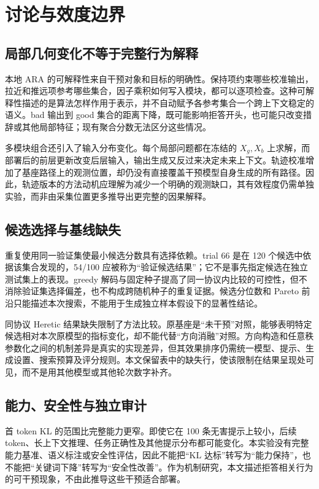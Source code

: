 \section{讨论与效度边界}
\label{sec:discussion}

\subsection{局部几何变化不等于完整行为解释}

本地 ARA 的可解释性来自干预对象和目标的明确性。保持项约束哪些校准输出，拉近和推远项参考哪些集合，因子乘积如何写入模块，都可以逐项检查。这种可解释性描述的是算法怎样作用于表示，并不自动赋予各参考集合一个跨上下文稳定的语义。bad 输出到 good 集合的距离下降，既可能影响拒答开头，也可能只改变措辞或其他局部特征；现有聚合分数无法区分这些情况。

多模块组合还引入了输入分布变化。每个局部问题都在冻结的 $X_g,X_b$ 上求解，而部署后的前层更新改变后层输入，输出生成又反过来决定未来上下文。轨迹校准增加了基座路径上的观测位置，却仍没有直接覆盖干预模型自身生成的所有路径。因此，轨迹版本的方法动机应理解为减少一个明确的观测缺口，其有效程度仍需单独实验，而非由采集位置更多推导出更完整的因果解释。

\subsection{候选选择与基线缺失}

重复使用同一验证集使最小候选分数具有选择依赖。trial 66 是在 120 个候选中依据该集合发现的，54/100 应被称为“验证候选结果”；它不是事先指定候选在独立测试集上的表现。greedy 解码与固定种子提高了同一协议内比较的可控性，但不消除验证集选择偏差，也不构成跨随机种子的重复证据。候选分位数和 Pareto 前沿只能描述本次搜索，不能用于生成独立样本假设下的显著性结论。

同协议 Heretic 结果缺失限制了方法比较。原基座是“未干预”对照，能够表明特定候选相对本次原模型的指标变化，却不能代替“方向消融”对照。方向构造和任意秩参数化之间的机制差异是真实的实现差异，但其效果排序仍需统一模型、提示、生成设置、搜索预算及评分规则。本文保留表中的缺失行，使该限制在结果呈现处可见，而不是用其他模型或其他轮次数字补齐。

\subsection{能力、安全性与独立审计}

首 token KL 的范围比完整能力更窄。即使它在 100 条无害提示上较小，后续 token、长上下文推理、任务正确性及其他提示分布都可能变化。本实验没有完整能力基准、语义标注或安全性评估，因此不能把“KL 达标”转写为“能力保持”，也不能把“关键词下降”转写为“安全性改善”。作为机制研究，本文描述拒答相关行为的可干预现象，不由此推导这些干预适合部署。

